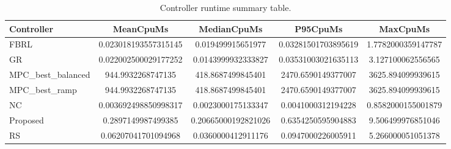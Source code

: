\begin{table}[t]
\centering
\caption{Controller runtime summary table.}
\label{tab:runtime_auto}
\begin{tabular}{lcccc}
\toprule
Controller & MeanCpuMs & MedianCpuMs & P95CpuMs & MaxCpuMs \\
\midrule
FBRL & 0.023018193557315145 & 0.019499915651977 & 0.03281501703895619 & 1.7782000359147787 \\
GR & 0.022002500029177252 & 0.0143999932333827 & 0.03531003021635113 & 3.127100062556565 \\
MPC\_best\_balanced & 944.9932268747135 & 418.8687499845401 & 2470.6590149377007 & 3625.894099939615 \\
MPC\_best\_ramp & 944.9932268747135 & 418.8687499845401 & 2470.6590149377007 & 3625.894099939615 \\
NC & 0.003692498850998317 & 0.0023000175133347 & 0.0041000312194228 & 0.8582000155001879 \\
Proposed & 0.2897149987499385 & 0.20665000192821026 & 0.6354250595904883 & 9.506499976851046 \\
RS & 0.06207041701094968 & 0.0360000412911176 & 0.0947000226005911 & 5.266000051051378 \\
\bottomrule
\end{tabular}
\end{table}